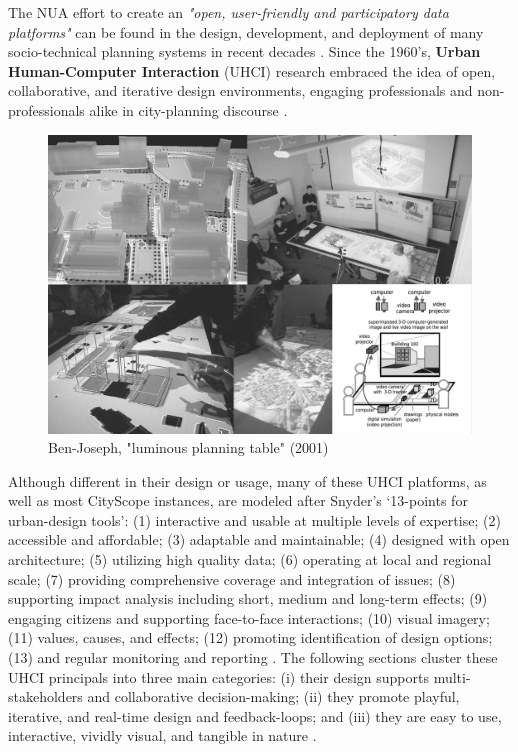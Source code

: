 {
    The NUA effort to create an \textit{"open, user-friendly and participatory data platforms"} can be found in the design, development, and deployment of many socio-technical planning systems in recent decades \cite{batty2013new, ben-joseph2001}. Since the 1960's, \textbf{Urban Human-Computer Interaction} (UHCI) research embraced the idea of open, collaborative, and iterative design environments, engaging professionals and non-professionals alike in city-planning discourse \cite{Ben-Joseph2004, Ishii2008}.


    \begin{figure}[h]
        \begin{center}
            \includegraphics[width=1\textwidth]{chapters/introduction/figures/ebj.png}
        \end{center}
        \caption{Ben-Joseph, "luminous planning table" (2001) \cite{ben-joseph2001}}
        \label{fig:luminous}
    \end{figure}


    Although different in their design or usage, many of these UHCI platforms, as well as most CityScope instances, are modeled after Snyder's `13-points for urban-design tools': (1) interactive and usable at multiple levels of expertise; (2) accessible and affordable; (3) adaptable and maintainable; (4) designed with open architecture; (5) utilizing high quality data; (6) operating at local and regional scale; (7) providing comprehensive coverage and integration of issues; (8) supporting impact analysis including short, medium and long-term effects; (9) engaging citizens and supporting face-to-face interactions; (10) visual imagery; (11) values, causes, and effects; (12) promoting identification of design options; (13) and regular monitoring and reporting \cite{Snyder2003}.
    \newline
    The following sections cluster these UHCI principals into three main categories:
    (i) their design supports multi-stakeholders and collaborative decision-making; (ii) they promote playful, iterative, and real-time design and feedback-loops; and (iii) they are easy to use, interactive, vividly visual, and tangible in nature \cite{Ullmer2010, ben-joseph2001, Snyder2003, mueller2018citizen}.

}
